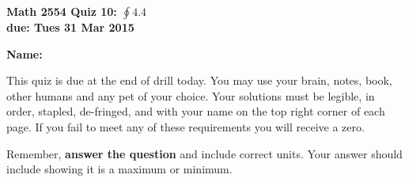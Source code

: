 \documentclass[12pt,letterpaper]{article}
\begin{document}
\flushleft
\begin{multicols}{2}


\textbf{Math 2554 Quiz 10: $\oint 4.4$ \\
due: Tues 31 Mar 2015}

\textbf{Name:  }\underline{\hspace{45ex}}

\vspace{.5in}

\end{multicols}

\pagestyle{empty}

\flushleft
This quiz is due at the end of drill today.  You may use your brain, notes, book, other humans and any pet of your choice. Your solutions must be legible, in order, stapled, de-fringed, and with your name on the top right corner of each page. If you fail to meet any of these requirements you will receive a zero. 

\vspace{1pc}
Remember, {\bf answer the question} and include correct units.  Your answer should include showing it is a maximum or minimum.  
\end{document}
